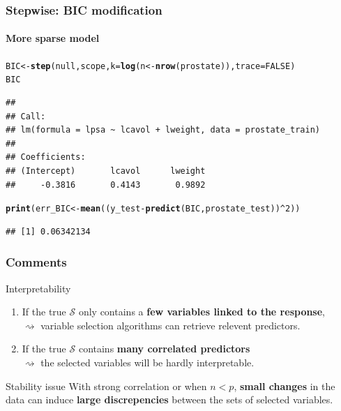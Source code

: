 \documentclass{beamer}\usepackage[]{graphicx}\usepackage[]{color}
\makeatletter
\newcommand{\hlnum}[1]{\textcolor[rgb]{0.686,0.059,0.569}{#1}}%
\newcommand{\hlopt}[1]{\textcolor[rgb]{0,0,0}{#1}}%
\newcommand{\hlstd}[1]{\textcolor[rgb]{0.345,0.345,0.345}{#1}}%
\newcommand{\hlkwb}[1]{\textcolor[rgb]{0.69,0.353,0.396}{#1}}%
\newcommand{\hlkwc}[1]{\textcolor[rgb]{0.333,0.667,0.333}{#1}}%
\newcommand{\hlkwd}[1]{\textcolor[rgb]{0.737,0.353,0.396}{\textbf{#1}}}%
\newenvironment{kframe}{%
 \def\at@end@of@kframe{}%
 \ifinner\ifhmode%
  \def\at@end@of@kframe{\end{minipage}}%
  \begin{minipage}{\columnwidth}%
 \fi\fi%
 \def\FrameCommand##1{\hskip\@totalleftmargin \hskip-\fboxsep
 \colorbox{shadecolor}{##1}\hskip-\fboxsep
     \hskip-\linewidth \hskip-\@totalleftmargin \hskip\columnwidth}%
 \MakeFramed {\advance\hsize-\width
   \@totalleftmargin\z@ \linewidth\hsize
   \@setminipage}}%
 {\par\unskip\endMakeFramed%
 \at@end@of@kframe}
\newenvironment{knitrout}{}{} %
\makeatother
\begin{document}
\begin{frame}[containsverbatim]
  \frametitle{Stepwise: BIC modification}
  \framesubtitle{More sparse model}
  
\begin{knitrout}\scriptsize
{}\color{fgcolor}\begin{kframe}
\begin{alltt}
\hlstd{BIC} \hlkwb{<-} \hlkwd{step}\hlstd{(null, scope,} \hlkwc{k} \hlstd{=} \hlkwd{log}\hlstd{(n} \hlkwb{<-} \hlkwd{nrow}\hlstd{(prostate)),} \hlkwc{trace}\hlstd{=}\hlnum{FALSE}\hlstd{)}
\hlstd{BIC}
\end{alltt}
\begin{verbatim}
## 
## Call:
## lm(formula = lpsa ~ lcavol + lweight, data = prostate_train)
## 
## Coefficients:
## (Intercept)       lcavol      lweight  
##     -0.3816       0.4143       0.9892
\end{verbatim}
\begin{alltt}
\hlkwd{print}\hlstd{(err_BIC}  \hlkwb{<-} \hlkwd{mean}\hlstd{((y_test} \hlopt{-} \hlkwd{predict}\hlstd{(BIC, prostate_test))}\hlopt{^}\hlnum{2}\hlstd{))}
\end{alltt}
\begin{verbatim}
## [1] 0.06342134
\end{verbatim}
\end{kframe}
\end{knitrout}
\end{frame}


\begin{frame}
  \frametitle{Comments}

  \begin{block}{Interpretability}
    \begin{enumerate}
    \item If the true $\mathcal{S}$ only contains a  \alert{\bf few
      variables linked to the response},\\
      $\rightsquigarrow$ variable selection algorithms can retrieve relevent predictors.
    \item  If the true   $\mathcal{S}$  contains  \alert{\bf many correlated predictors}\\
      $\rightsquigarrow$  the selected variables will be hardly interpretable.
    \end{enumerate}
  \end{block}

  \vfill

  \begin{block}{Stability issue}
    With strong correlation or when $n < p$, \alert{\bf small changes} in the data can induce   \alert{\bf large discrepencies }  between the sets of selected variables.
   \end{block}

\end{frame}
\end{document}
